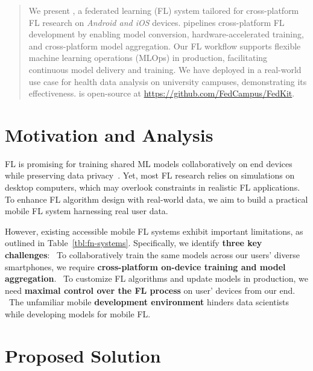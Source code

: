 \documentclass[conference]{IEEEtran}
\begin{document}
\maketitle
\begin{abstract}
We present \FedKit{}, a federated learning (FL) system tailored for
cross-platform FL research on \textit{Android and iOS} devices.
\FedKit{} pipelines cross-platform FL development by
enabling model conversion,
hardware-accelerated training,
and cross-platform model aggregation.
Our FL workflow supports flexible machine learning operations (MLOps) in production,
facilitating continuous model delivery and training.
We have deployed \FedKit{} in a real-world use case for
health data analysis on university campuses,
demonstrating its effectiveness.
\FedKit{} is open-source at \url{https://github.com/FedCampus/FedKit}.
\end{abstract}


\section{Motivation and Analysis}
FL is promising for training shared ML models collaboratively on
end devices while preserving data privacy~\cite{farcas2023demo}.
Yet, most FL research relies on simulations on desktop computers,
which may overlook constraints in realistic FL applications.
To enhance FL algorithm design with real-world data,
we aim to build a practical mobile FL system
harnessing real user data.

However,
existing accessible mobile FL systems exhibit important limitations,
as outlined in Table~\ref{tbl:fn-systems}.
Specifically, we identify \textbf{three key challenges}:
\challa~To collaboratively train the same models across
our users' diverse smartphones,
we require \textbf{cross-platform on-device training and model aggregation}.
\challb~To customize FL algorithms and update models in production,
we need \textbf{maximal control over the FL process} on
user' devices from our end.
\challc~The unfamiliar mobile \textbf{development environment} hinders
data scientists while developing models for mobile FL.

\section{Proposed Solution}
\end{document}

